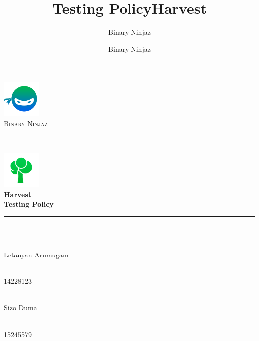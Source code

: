 \documentclass[12pt]{article}
\title{Testing Policy}
\author{Binary Ninjaz}
\date{}
\author{Binary Ninjaz}
\title{Harvest}
\begin{document}
\begin{titlepage}

	\begin{center}
		\includegraphics[height=5em]{images/Bin.png}\\
		\textsc{\LARGE Binary Ninjaz}\\[0.3cm]
		\rule{\linewidth}{0.5mm} \\[0.5cm]
		\includegraphics[height=5em]{images/Icon.png}\\
		{ \huge \bfseries Harvest \\
		  \vspace{0.3cm}\large \bfseries Testing Policy}\\[0.5cm]
		\rule{\linewidth}{0.5mm} \\[1cm]


		\begin{minipage}{0.4\textwidth}
			\begin{flushleft} \large
				\emph{} \\
				Letanyan {Arumugam}
			\end{flushleft}
		\end{minipage}
		\begin{minipage}{0.4\textwidth}
			\begin{flushright} \large
				\emph{} \\
				14228123
			\end{flushright}
		\end{minipage}

		\begin{minipage}{0.4\textwidth}
			\begin{flushleft} \large
            	\emph{} \\
				Sizo {Duma}
			\end{flushleft}
		\end{minipage}
		\begin{minipage}{0.4\textwidth}
			\begin{flushright} \large
				\emph{} \\
				15245579
			\end{flushright}
		\end{minipage}


\end{center}
\end{titlepage}
\end{document}
